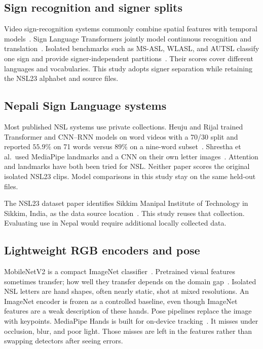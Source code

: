 \documentclass[11pt,a4paper]{article}
\begin{document}
\subsection{Sign recognition and signer splits}

Video sign-recognition systems commonly combine spatial features with temporal models~\cite{rastgoo2021survey}. Sign Language Transformers jointly model continuous recognition and translation~\cite{camgoz2020sign}. Isolated benchmarks such as MS-ASL, WLASL, and AUTSL classify one sign and provide signer-independent partitions~\cite{vaezi2019msasl,li2020wlasl,sincan2020autsl}. Their scores cover different languages and vocabularies. This study adopts signer separation while retaining the NSL23 alphabet and source files.

\subsection{Nepali Sign Language systems}

Most published NSL systems use private collections. Heuju and Rijal trained Transformer and CNN--RNN models on word videos with a 70/30 split and reported $55.9\%$ on 71 words versus $89\%$ on a nine-word subset~\cite{heuju2022word}. Shrestha et al.\ used MediaPipe landmarks and a CNN on their own letter images~\cite{shrestha2024mediapipe}. Attention and landmarks have both been tried for NSL. Neither paper scores the original isolated NSL23 clips. Model comparisons in this study stay on the same held-out files.

The NSL23 dataset paper identifies Sikkim Manipal Institute of Technology in Sikkim, India, as the data source location~\cite{sunuwar2024nsl23}. This study reuses that collection. Evaluating use in Nepal would require additional locally collected data.

\subsection{Lightweight RGB encoders and pose}

MobileNetV2 is a compact ImageNet classifier~\cite{sandler2018mobilenetv2}. Pretrained visual features sometimes transfer; how well they transfer depends on the domain gap~\cite{kornblith2019better}. Isolated NSL letters are hand shapes, often nearly static, shot at mixed resolutions. An ImageNet encoder is frozen as a controlled baseline, even though ImageNet features are a weak description of these hands. Pose pipelines replace the image with keypoints. MediaPipe Hands is built for on-device tracking~\cite{zhang2020mediapipe}. It misses under occlusion, blur, and poor light. Those misses are left in the features rather than swapping detectors after seeing errors.
\end{document}
